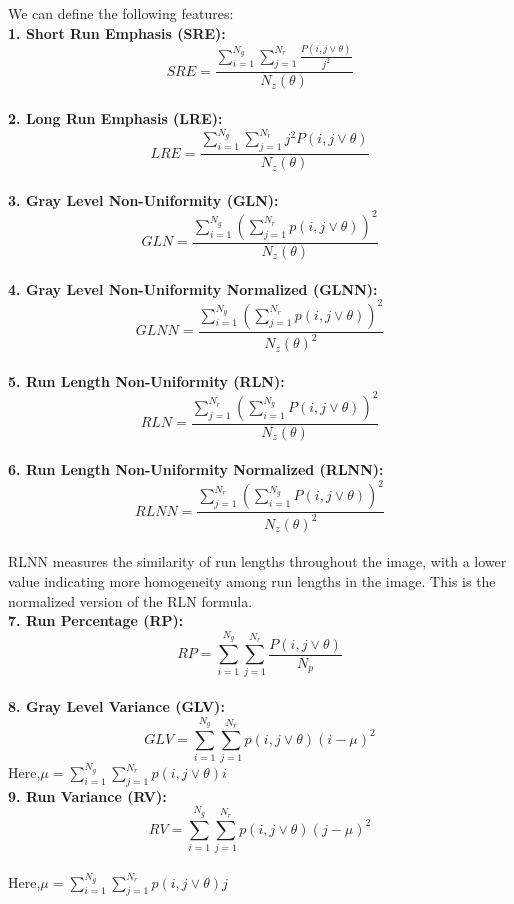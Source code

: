 We can define the following features: \\
\textbf{1. Short Run Emphasis (SRE):}\\
\[SRE=\frac{\sum _{i=1}^{N_{g}}\sum _{j=1}^{N_{r}}\frac{P\left(i,j\vee \theta \right)}{j^{2}}}{N_{z}\left(\theta \right)}\]\\
\textbf{2. Long Run Emphasis (LRE):}\\
\[LRE=\frac{\sum _{i=1}^{N_{g}}\sum _{j=1}^{N_{r}}j^{2}P\left(i,j\vee \theta \right)}{N_{z}\left(\theta \right)}\]\\
\textbf{3. Gray Level Non-Uniformity (GLN):}\\
\[GLN=\frac{\sum _{i=1}^{N_{g}}\left(\sum _{j=1}^{N_{r}}p\left(i,j\vee \theta \right)\right)^{2}}{N_{z}\left(\theta \right)}\]\\
\textbf{4. Gray Level Non-Uniformity Normalized (GLNN):}\\
\[GLNN=\frac{\sum _{i=1}^{N_{g}}\left(\sum _{j=1}^{N_{r}}p\left(i,j\vee \theta \right)\right)^{2}}{{N_{z}}\left(\theta \right)^{2}}\]\\
\textbf{5. Run Length Non-Uniformity (RLN):}\\
\[RLN=\frac{\sum _{j=1}^{N_{r}}\left(\sum _{i=1}^{N_{g}}P\left(i,j\vee \theta \right)\right)^{2}}{N_{z}\left(\theta \right)}\]\\
\textbf{6. Run Length Non-Uniformity Normalized (RLNN):}\\
\[RLNN=\frac{\sum _{j=1}^{N_{r}}\left(\sum _{i=1}^{N_{g}}P\left(i,j\vee \theta \right)\right)^{2}}{{N_{z}}\left(\theta \right)^{2}}\]\\
RLNN measures the similarity of run lengths throughout the image, with a lower value indicating more homogeneity among run lengths in the image. This is the normalized version of the RLN formula.\\
\textbf{7. Run Percentage (RP):}\\
\[RP=\sum _{i=1}^{N_{g}}\sum _{j=1}^{N_{r}}\frac{P\left(i,j\vee \theta \right)}{N_{p}}\]\\
\textbf{8. Gray Level Variance (GLV):}\\
\[GLV=\sum _{i=1}^{N_{g}}\sum _{j=1}^{N_{r}}p\left(i,j\vee \theta \right)\left(i-\mu \right)^{2}\]
Here,$\mu =\sum _{i=1}^{N_{g}}\sum _{j=1}^{N_{r}}p\left(i,j\vee \theta \right)i$\\
\textbf{9. Run Variance (RV):}\\
\[RV=\sum _{i=1}^{N_{g}}\sum _{j=1}^{N_{r}}p\left(i,j\vee \theta \right)\left(j-\mu \right)^{2}\]\\
Here,$\mu =\sum _{i=1}^{N_{g}}\sum _{j=1}^{N_{r}}p\left(i,j\vee \theta \right)j$\\

